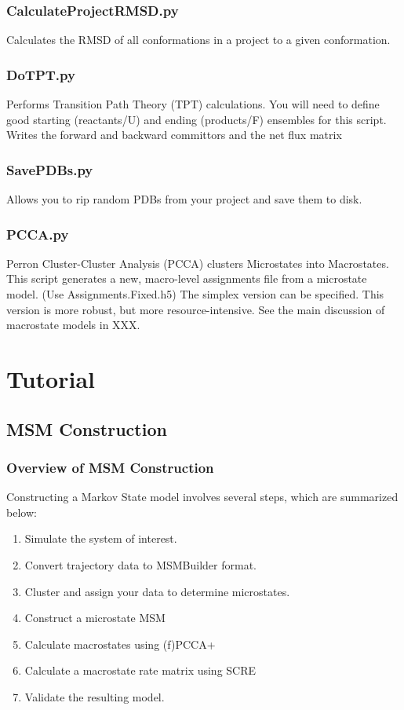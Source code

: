 \documentclass[12pt]{article}
\begin{document}
\subsubsection{CalculateProjectRMSD.py}
Calculates the RMSD of all conformations in a project to a given conformation.

\subsubsection{DoTPT.py}
Performs Transition Path Theory (TPT) calculations. You will need to define good starting (reactants/U) and ending (products/F) ensembles for this script. Writes the forward and backward committors and the net flux matrix

\subsubsection{SavePDBs.py}
Allows you to rip random PDBs from your project and save them to disk.

\subsubsection{PCCA.py}
Perron Cluster-Cluster Analysis (PCCA) clusters Microstates into Macrostates. This script generates a new, macro-level assignments file from a microstate model. (Use Assignments.Fixed.h5) The simplex version can be specified. This version is more robust, but more resource-intensive. See the main discussion of macrostate models in XXX.

\newpage

\section{Tutorial}
\subsection{MSM Construction}

\subsubsection{Overview of MSM Construction}
Constructing a Markov State model involves several steps, which are summarized below:
\begin{enumerate}
 \item Simulate the system of interest.
 \item Convert trajectory data to MSMBuilder format.
 \item Cluster and assign your data to determine microstates.
 \item Construct a microstate MSM
 \item Calculate macrostates using (f)PCCA+
 \item Calculate a macrostate rate matrix using SCRE
 \item Validate the resulting model.
\end{enumerate}
\end{document}
